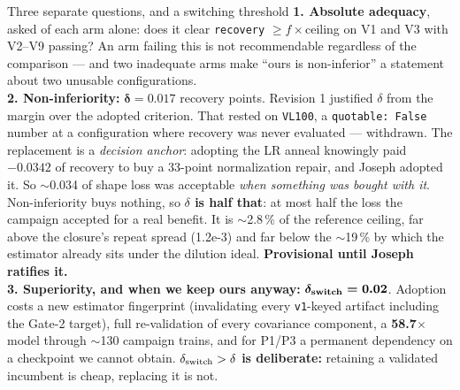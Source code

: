 \documentclass[aspectratio=169,10pt]{beamer}
\newcommand{\warn}[1]{\textcolor{warn}{#1}}
\begin{document}
\begin{frame}[t]{Three separate questions, and a switching threshold}
  \vspace{0.2em}
  {\scriptsize
  \textbf{1. Absolute adequacy}, asked of each arm alone: does it clear
  \texttt{recovery} $\ge f\times$ceiling on V1 and V3 with V2--V9 passing?
  \warn{An arm failing this is not recommendable regardless of the comparison} --- and
  two inadequate arms make ``ours is non-inferior'' a statement about two unusable
  configurations.
  \\[0.3em]
  \textbf{2. Non-inferiority:} $\boldsymbol{\delta = 0.017}$ recovery points.
  \warn{Revision 1 justified $\delta$ from the margin over the adopted criterion. That
  rested on \texttt{VL100}, a \texttt{quotable: False} number at a configuration where
  recovery was never evaluated --- withdrawn.} The replacement is a \emph{decision
  anchor}: adopting the LR anneal knowingly paid \textbf{$-0.0342$} of recovery to buy a
  33-point normalization repair, and Joseph adopted it. So $\sim$0.034 of shape loss was
  acceptable \emph{when something was bought with it}. Non-inferiority buys nothing, so
  \textbf{$\delta$ is half that}: at most half the loss the campaign accepted for a real
  benefit. It is $\sim$2.8\,\% of the reference ceiling, far above the closure's repeat
  spread (1.2e-3) and far below the $\sim$19\,\% by which the estimator already sits under
  the dilution ideal. \textbf{Provisional until Joseph ratifies it.}
  \\[0.3em]
  \textbf{3. Superiority, and when we keep ours anyway:}
  $\boldsymbol{\delta_{\rm switch} = 0.02}$. Adoption costs a new estimator fingerprint
  (invalidating every \texttt{v1}-keyed artifact including the Gate-2 target), full
  re-validation of every covariance component, a \textbf{58.7$\times$} model through
  $\sim$130 campaign trains, and for P1/P3 a permanent dependency on a checkpoint we
  cannot obtain. \textbf{$\delta_{\rm switch} > \delta$ is deliberate:} retaining a
  validated incumbent is cheap, replacing it is not.}
  \vspace{0.2em}


\end{frame}
\end{document}
